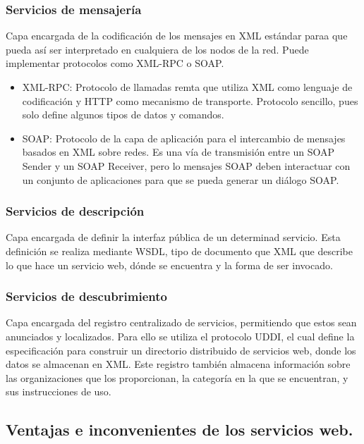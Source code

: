 	\subsubsection{Servicios de mensajería}
	
	Capa encargada de la codificación de los mensajes en XML estándar paraa que pueda así ser interpretado en cualquiera de los 	nodos de la red. Puede implementar protocolos como XML-RPC o SOAP.
	
	\begin{itemize}
		\item XML-RPC: Protocolo de llamadas remta que utiliza XML como lenguaje de codificación y HTTP como mecanismo de transporte. Protocolo sencillo, pues solo define algunos tipos de datos y comandos.
		\item SOAP: Protocolo de la capa de aplicación para el intercambio de mensajes basados en XML sobre redes. Es una vía de transmisión entre un SOAP Sender y un SOAP Receiver, pero lo mensajes SOAP deben interactuar con un conjunto de aplicaciones para que se pueda generar un diálogo SOAP.
	\end{itemize}
	
	\subsubsection{Servicios de descripción}
	
	Capa encargada de definir la interfaz pública de un determinad servicio. Esta definición se realiza mediante WSDL, tipo de documento que XML que describe lo que hace un servicio web, dónde se encuentra y la forma de ser invocado.
	
	\subsubsection{Servicios de descubrimiento}
	
	Capa encargada del registro centralizado de servicios, permitiendo que estos sean anunciados y localizados. Para ello se utiliza el protocolo UDDI, el cual define la especificación para construir un directorio distribuido de servicios web, donde los datos se almacenan en XML. Este registro también almacena información sobre las organizaciones que los proporcionan, la categoría en la que se encuentran, y sus instrucciones de uso. 
	
	\subsection{Ventajas e inconvenientes de los servicios web.}
	\label{cap2:subsec:servicios_web}
	

